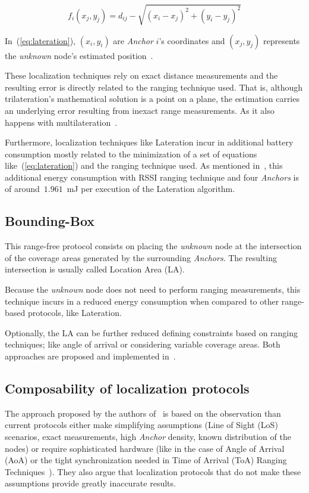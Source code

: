 \begin{equation}\label{eq:lateration}
 f_{i}(x_{j},y_{j})=d_{ij}-\sqrt{(x_{i}-x_{j})^2+(y_{i}-y_{j})^2}
\end{equation}

In~(\ref{eq:lateration}), $(x_{i},y_{i})$ are \emph{Anchor} $i$'s coordinates and $(x_{j},y_{j})$ represents the \emph{unknown} node's estimated position~\cite{rang:loc:techniques}.

These localization techniques rely on exact distance measurements and the resulting error is directly related to the ranging technique used. That is, although trilateration's mathematical solution is a point on a plane, the estimation carries an underlying error resulting from inexact range measurements. As it also happens with multilateration~\cite{AkyildizWSNs}.

Furthermore, localization techniques like Lateration incur in additional battery consumption mostly related to the minimization of a set of equations like~(\ref{eq:lateration}) and the ranging technique used. As mentioned in~\cite{laterationSpecs}, this additional energy consumption with RSSI ranging technique and four \emph{Anchors} is of around~$1.961$~mJ per execution of the Lateration algorithm.

\subsection{Bounding-Box}
This range-free protocol consists on placing the \emph{unknown} node at the intersection of the coverage areas generated by the surrounding \emph{Anchors}. The resulting intersection is usually called Location Area (LA). 


Because the \emph{unknown} node does not need to perform ranging measurements, this technique incurs in a reduced energy consumption when compared to other range-based protocols, like Lateration.

Optionally, the LA can be further reduced defining constraints based on ranging techniques; like angle of arrival or considering variable coverage areas. Both approaches are proposed and implemented in~\cite{convexEstimation}. 

\subsection{Composability of localization protocols}
The approach proposed by the authors of~\cite{composability} is based on the observation than current protocols either make simplifying assumptions (Line of Sight (LoS) scenarios, exact measurements, high \emph{Anchor} density, known distribution of the nodes) or require sophisticated hardware (like in the case of Angle of Arrival (AoA) or the tight synchronization needed in Time of Arrival (ToA) Ranging Techniques~\cite{AkyildizWSNs}). They also argue that localization protocols that do not make these assumptions provide greatly inaccurate results.

